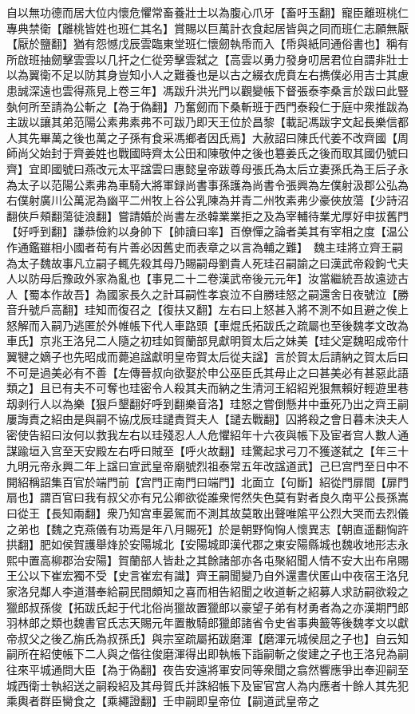 自以無功德而居大位内懷危懼常畜養壯士以為腹心爪牙【畜吁玉翻】寵臣離班桃仁專典禁衛【離桃皆姓也班仁其名】賞賜以巨萬計衣食起居皆與之同而班仁志願無厭【厭於鹽翻】猶有怨憾戊辰雲臨東堂班仁懷劒執帋而入【帋與紙同通俗書也】稱有所啟班抽劒擊雲雲以几扞之仁從旁擊雲弑之【高雲以勇力發身叨居君位自謂非壯士以為翼衛不足以防其身豈知小人之難養也是以古之綴衣虎賁左右擕僕必用吉士其慮患誠深遠也雲得燕見上卷三年】馮跋升洪光門以觀變帳下督張泰李桑言於跋曰此豎埶何所至請為公斬之【為于偽翻】乃奮劒而下桑斬班于西門泰殺仁于庭中衆推跋為主跋以讓其弟范陽公素弗素弗不可跋乃即天王位於昌黎【載記馮跋字文起長樂信都人其先畢萬之後也萬之子孫有食采馮鄉者因氏焉】大赦詔曰陳氏代姜不改齊國【周師尚父始封于齊姜姓也戰國時齊太公田和陳敬仲之後也簒姜氏之後而取其國仍號曰齊】宜即國號曰燕改元太平諡雲曰惠懿皇帝跋尊母張氏為太后立妻孫氏為王后子永為太子以范陽公素弗為車騎大將軍録尚書事孫護為尚書令張興為左僕射汲郡公弘為右僕射廣川公萬泥為幽平二州牧上谷公乳陳為并青二州牧素弗少豪俠放蕩【少詩沼翻俠戶頰翻蕩徒浪翻】嘗請婚於尚書左丞韓業業拒之及為宰輔待業尤厚好申拔舊門【好呼到翻】謙恭儉約以身帥下【帥讀曰率】百僚憚之論者美其有宰相之度【温公作通鑑雖相小國者苟有片善必因舊史而表章之以言為輔之難】　魏主珪將立齊王嗣為太子魏故事凡立嗣子輒先殺其母乃賜嗣母劉貴人死珪召嗣諭之曰漢武帝殺鉤弋夫人以防母后豫政外家為亂也【事見二十二卷漢武帝後元元年】汝當繼統吾故遠迹古人【蜀本作故吾】為國家長久之計耳嗣性孝哀泣不自勝珪怒之嗣還舍日夜號泣【勝音升號戶高翻】珪知而復召之【復扶又翻】左右曰上怒甚入將不測不如且避之俟上怒解而入嗣乃逃匿於外帷帳下代人車路頭【車焜氏拓跋氏之疏屬也至後魏孝文改為車氏】京兆王洛兒二人隨之初珪如賀蘭部見獻明賀太后之妹美【珪父寔魏昭成帝什翼犍之嫡子也先昭成而薨追諡獻明皇帝賀太后從夫諡】言於賀太后請納之賀太后曰不可是過美必有不善【左傳晉叔向欲娶於申公巫臣氏其母止之曰甚美必有甚惡此語類之】且已有夫不可奪也珪密令人殺其夫而納之生清河王紹紹兇狠無賴好輕遊里巷刼剥行人以為樂【狠戶墾翻好呼到翻樂音洛】珪怒之嘗倒懸井中垂死乃出之齊王嗣屢誨責之紹由是與嗣不協戊辰珪譴責賀夫人【譴去戰翻】囚將殺之會日暮未決夫人密使告紹曰汝何以救我左右以珪殘忍人人危懼紹年十六夜與帳下及宦者宫人數人通謀踰垣入宫至天安殿左右呼曰賊至【呼火故翻】珪驚起求弓刀不獲遂弑之【年三十九明元帝永興二年上諡曰宣武皇帝廟號烈祖泰常五年改諡道武】己巳宫門至日中不開紹稱詔集百官於端門前【宫門正南門曰端門】北面立【句斷】紹從門扉間【扉門扇也】謂百官曰我有叔父亦有兄公卿欲從誰衆愕然失色莫有對者良久南平公長孫嵩曰從王【長知兩翻】衆乃知宫車晏駕而不測其故莫敢出聲唯隂平公烈大哭而去烈儀之弟也【魏之克燕儀有功焉是年八月賜死】於是朝野恟恟人懷異志【朝直遥翻恟許拱翻】肥如侯賀護舉烽於安陽城北【安陽城即漢代郡之東安陽縣城也魏收地形志永熙中置高柳郡治安陽】賀蘭部人皆赴之其餘諸部亦各屯聚紹聞人情不安大出布帛賜王公以下崔宏獨不受【史言崔宏有識】齊王嗣聞變乃自外還晝伏匿山中夜宿王洛兒家洛兒鄰人李道潛奉給嗣民間頗知之喜而相告紹聞之收道斬之紹募人求訪嗣欲殺之獵郎叔孫俊【拓跋氏起于代北俗尚獵故置獵郎以豪望子弟有材勇者為之亦漢期門郎羽林郎之類也魏書官氏志天賜元年置散騎郎獵郎諸省令史省事典籖等後魏孝文以獻帝叔父之後乙旃氏為叔孫氏】與宗室疏屬拓跋磨渾【磨渾元城侯屈之子也】自云知嗣所在紹使帳下二人與之偕往俊磨渾得出即執帳下詣嗣斬之俊建之子也王洛兒為嗣往來平城通問大臣【為于偽翻】夜告安遠將軍安同等衆聞之翕然響應爭出奉迎嗣至城西衛士執紹送之嗣殺紹及其母賀氏并誅紹帳下及宦官宫人為内應者十餘人其先犯乘輿者群臣臠食之【乘繩證翻】壬申嗣即皇帝位【嗣道武皇帝之